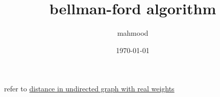 \documentclass[a4paper,12pt]{article}
\author{mahmood}
\date{\today}
\title{bellman-ford algorithm}
\begin{document}
\maketitle
refer to \href{20230314002402-directed_graph.org}{distance in undirected graph with real weights}\\

\end{document}
